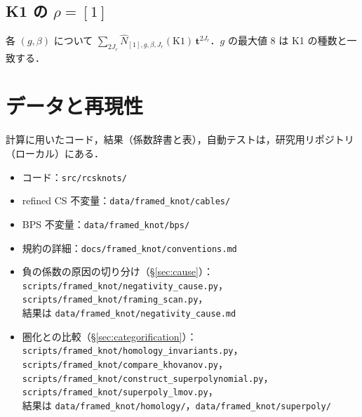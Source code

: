 \documentclass[11pt,a4paper]{ltjsarticle}
\theoremstyle{definition}
\theoremstyle{remark}
\newcommand{\bt}{\mathbf{t}}
\newcommand{\hN}{\widehat{N}}
\begin{document}
\begin{landscape}
\section{K1 の $\rho=[1]$}\label{app:K1}
\begin{center}
\tiny

\end{center}
各 $(g,\beta)$ について $\sum_{2J_r}\hN_{[1],g,\beta,J_r}(\mathrm{K1})\,\bt^{2J_r}$．$g$ の最大値 8 は K1 の種数と一致する．
\end{landscape}

\section{データと再現性}

計算に用いたコード，結果（係数辞書と表），自動テストは，研究用リポジトリ（ローカル）にある．
\begin{itemize}
\item コード：\texttt{src/rcsknots/}
\item refined CS 不変量：\texttt{data/framed_knot/cables/}
\item BPS 不変量：\texttt{data/framed_knot/bps/}
\item 規約の詳細：\texttt{docs/framed_knot/conventions.md}
\item 負の係数の原因の切り分け（\S\ref{sec:cause}）：\\ \texttt{scripts/framed_knot/negativity\_cause.py}，\texttt{scripts/framed_knot/framing\_scan.py}，\\ 結果は \texttt{data/framed_knot/negativity\_cause.md}
\item 圏化との比較（\S\ref{sec:categorification}）：\\ \texttt{scripts/framed_knot/homology\_invariants.py}，\texttt{scripts/framed_knot/compare\_khovanov.py}，\\ \texttt{scripts/framed_knot/construct\_superpolynomial.py}，\texttt{scripts/framed_knot/superpoly\_lmov.py}，\\ 結果は \texttt{data/framed_knot/homology/}，\texttt{data/framed_knot/superpoly/}
\end{itemize}
\end{document}
